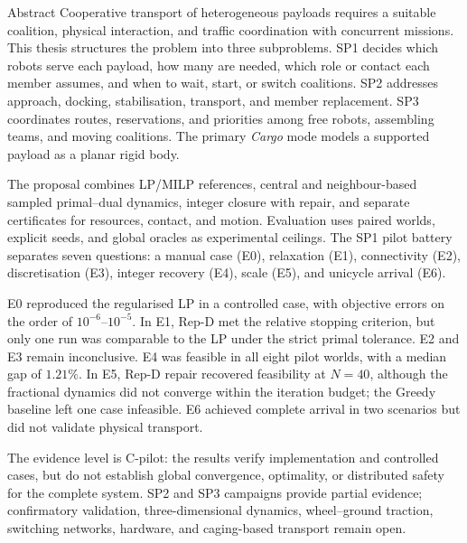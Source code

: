 \begin{viuabstract}{Abstract}
Cooperative transport of heterogeneous payloads requires a suitable coalition,
physical interaction, and traffic coordination with concurrent missions. This
thesis structures the problem into three subproblems. SP1 decides which robots
serve each payload, how many are needed, which role or contact each member
assumes, and when to wait, start, or switch coalitions. SP2 addresses approach,
docking, stabilisation, transport, and member replacement. SP3 coordinates
routes, reservations, and priorities among free robots, assembling teams, and
moving coalitions. The primary \emph{Cargo} mode models a supported payload as a
planar rigid body.

The proposal combines LP/MILP references, central and neighbour-based sampled
primal--dual dynamics, integer closure with repair, and separate certificates
for resources, contact, and motion. Evaluation uses paired worlds, explicit
seeds, and global oracles as experimental ceilings. The SP1 pilot battery
separates seven questions: a manual case (E0), relaxation (E1), connectivity
(E2), discretisation (E3), integer recovery (E4), scale (E5), and unicycle
arrival (E6).

E0 reproduced the regularised LP in a controlled case, with objective errors on
the order of \(10^{-6}\)--\(10^{-5}\). In E1, Rep-D met the relative stopping
criterion, but only one run was comparable to the LP under the strict primal
tolerance. E2 and E3 remain inconclusive. E4 was feasible in all eight pilot worlds, with a median
gap of \(1.21\%\). In E5, Rep-D repair recovered feasibility at \(N=40\),
although the fractional dynamics did not converge within the iteration budget;
the Greedy baseline left one case infeasible. E6 achieved complete arrival in
two scenarios but did not validate physical transport.

The evidence level is C-pilot: the results verify implementation and controlled
cases, but do not establish global convergence, optimality, or distributed
safety for the complete system. SP2 and SP3 campaigns provide partial evidence;
confirmatory validation, three-dimensional dynamics, wheel--ground traction,
switching networks, hardware, and caging-based transport remain open.

\end{viuabstract}

\clearpage
